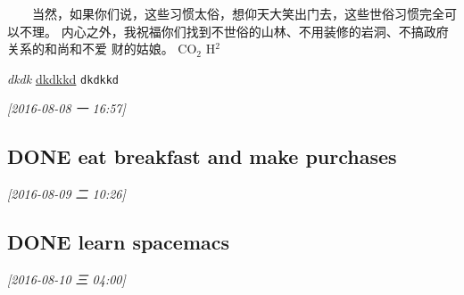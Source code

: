 \documentclass[11pt]{ctexart}
\begin{document}
 　　当然，如果你们说，这些习惯太俗，想仰天大笑出门去，这些世俗习惯完全可以不理。
 内心之外，我祝福你们找到不世俗的山林、不用装修的岩洞、不搞政府关系的和尚和不爱
 财的姑娘。
CO\(_{\text{2}}\)
H\(^{\text{2}}\)

\emph{dkdk}
\uline{dkdkkd}
\texttt{dkdkkd}

\textit{[2016-08-08 一 16:57]}

\subsection{{\bfseries\sffamily DONE} eat breakfast and make purchases}
\label{sec:orgheadline68}
\textit{[2016-08-09 二 10:26]}

\subsection{{\bfseries\sffamily DONE} learn spacemacs}
\label{sec:orgheadline69}
\textit{[2016-08-10 三 04:00]}
\end{document}
